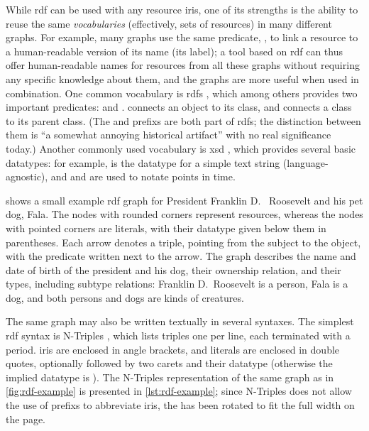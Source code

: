 While \gls{rdf} can be used with any \gls{resource} \glspl{iri},
one of its strengths is the ability to reuse the same \emph{vocabularies}
(effectively, sets of \glspl{resource})
in many different graphs.
For example, many graphs use the same \gls{predicate}, ,
to link a \gls{resource} to a human-readable version of its name (its label);
a tool based on \gls{rdf} can thus offer human-readable names for \glspl{resource} from all these graphs
without requiring any specific knowledge about them,
and the graphs are more useful when used in combination.
One common vocabulary is \acrfull{rdfs} \cite{Guha:14:RS},
which among others provides two important predicates:
 and .
 connects an object to its class,
and  connects a class to its parent class.
(The  and  \glspl{prefix} are both part of \acrlong{rdfs};
the distinction between them is “a somewhat annoying historical artifact” \cite{Schreiber:14:RP}
with no real significance today.)
Another commonly used vocabulary is \gls{xsd} \cite{Malhotra:04:XSP},
which provides several basic datatypes:
for example,  is the datatype for a simple text string (language-agnostic),
and  and  are used to notate points in time.

 shows a small example \gls{rdf} graph
for President Franklin D.~ Roosevelt and his pet dog, Fala.
The nodes with rounded corners represent \glspl{resource},
whereas the nodes with pointed corners are literals,
with their datatype given below them in parentheses.
Each arrow denotes a \gls{triple}, pointing from the \gls{subject} to the \gls{object},
with the \gls{predicate} written next to the arrow.
The graph describes the name and date of birth of the president and his dog,
their ownership relation,
and their types, including subtype relations:
Franklin D.~Roosevelt is a person, Fala is a dog,
and both persons and dogs are kinds of creatures.

The same graph may also be written textually in several syntaxes.
The simplest \gls{rdf} syntax is \gls{N-Triples} \cite{Seaborne:14:RN},
which lists \glspl{triple} one per line, each terminated with a period.
\Glspl{iri} are enclosed in angle brackets,
and literals are enclosed in double quotes,
optionally followed by two carets and their datatype
(otherwise the implied datatype is ).
The \gls{N-Triples} representation of the same graph as in \cref{fig:rdf-example}
is presented in \cref{lst:rdf-example};
since \gls{N-Triples} does not allow the use of \glspl{prefix} to abbreviate \glspl{iri},
the  has been rotated to fit the full width on the page.

